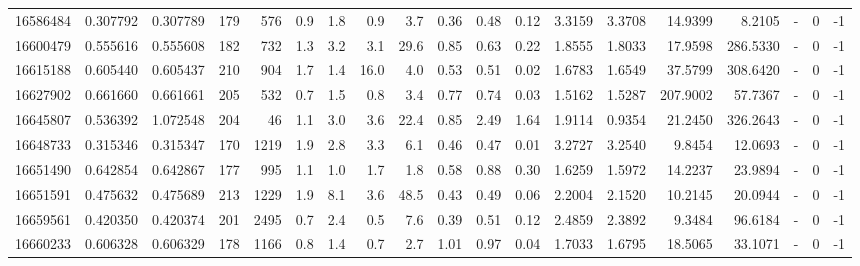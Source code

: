 \begin{tabular}{rrrrrrrrrrrrrrrrlrr}
  16586484 & 0.307792 &   0.307789 &  179 &  576 &      0.9 &      1.8 &     0.9 &      3.7 &       0.36 &        0.48 &        0.12 &  3.3159 &  3.3708 &   14.9399 &    8.2105 &             - &        0 &         -1 \\
  16600479 & 0.555616 &   0.555608 &  182 &  732 &      1.3 &      3.2 &     3.1 &     29.6 &       0.85 &        0.63 &        0.22 &  1.8555 &  1.8033 &   17.9598 &  286.5330 &             - &        0 &         -1 \\
  16615188 & 0.605440 &   0.605437 &  210 &  904 &      1.7 &      1.4 &    16.0 &      4.0 &       0.53 &        0.51 &        0.02 &  1.6783 &  1.6549 &   37.5799 &  308.6420 &             - &        0 &         -1 \\
  16627902 & 0.661660 &   0.661661 &  205 &  532 &      0.7 &      1.5 &     0.8 &      3.4 &       0.77 &        0.74 &        0.03 &  1.5162 &  1.5287 &  207.9002 &   57.7367 &             - &        0 &         -1 \\
  16645807 & 0.536392 &   1.072548 &  204 &   46 &      1.1 &      3.0 &     3.6 &     22.4 &       0.85 &        2.49 &        1.64 &  1.9114 &  0.9354 &   21.2450 &  326.2643 &             - &        0 &         -1 \\
  16648733 & 0.315346 &   0.315347 &  170 & 1219 &      1.9 &      2.8 &     3.3 &      6.1 &       0.46 &        0.47 &        0.01 &  3.2727 &  3.2540 &    9.8454 &   12.0693 &             - &        0 &         -1 \\
  16651490 & 0.642854 &   0.642867 &  177 &  995 &      1.1 &      1.0 &     1.7 &      1.8 &       0.58 &        0.88 &        0.30 &  1.6259 &  1.5972 &   14.2237 &   23.9894 &             - &        0 &         -1 \\
  16651591 & 0.475632 &   0.475689 &  213 & 1229 &      1.9 &      8.1 &     3.6 &     48.5 &       0.43 &        0.49 &        0.06 &  2.2004 &  2.1520 &   10.2145 &   20.0944 &             - &        0 &         -1 \\
  16659561 & 0.420350 &   0.420374 &  201 & 2495 &      0.7 &      2.4 &     0.5 &      7.6 &       0.39 &        0.51 &        0.12 &  2.4859 &  2.3892 &    9.3484 &   96.6184 &             - &        0 &         -1 \\
  16660233 & 0.606328 &   0.606329 &  178 & 1166 &      0.8 &      1.4 &     0.7 &      2.7 &       1.01 &        0.97 &        0.04 &  1.7033 &  1.6795 &   18.5065 &   33.1071 &             - &        0 &         -1 \\

\end{tabular}
